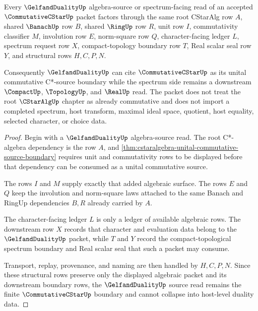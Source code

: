 \begin{theorem}
\label{thm:commutative-c-star-gelfand-spectrum-boundary}
Every $\GelfandDualityUp$ algebra-source or spectrum-facing read of an accepted $\CommutativeCStarUp$ packet factors through the same root CStarAlg row $A$, shared $\BanachUp$ row $B$, shared $\RingUp$ row $R$, unit row $I$, commutativity classifier $M$, involution row $E$, norm-square row $Q$, character-facing ledger $L$, spectrum request row $X$, compact-topology boundary row $T$, Real scalar seal row $Y$, and structural rows $H,C,P,N$.

Consequently $\GelfandDualityUp$ can cite $\CommutativeCStarUp$ as its unital commutative C*-source boundary while the spectrum side remains a downstream $\CompactUp$, $\TopologyUp$, and $\RealUp$ read. The packet does not treat the root $\CStarAlgUp$ chapter as already commutative and does not import a completed spectrum, host transform, maximal ideal space, quotient, host equality, selected character, or choice data.
\end{theorem}
\begin{proof}
Begin with a $\GelfandDualityUp$ algebra-source read. The root C*-algebra dependency is the row $A$, and \autoref{thm:cstaralgebra-unital-commutative-source-boundary} requires unit and commutativity rows to be displayed before that dependency can be consumed as a unital commutative source.

The rows $I$ and $M$ supply exactly that added algebraic surface. The rows $E$ and $Q$ keep the involution and norm-square laws attached to the same Banach and RingUp dependencies $B,R$ already carried by $A$.

The character-facing ledger $L$ is only a ledger of available algebraic rows. The downstream row $X$ records that character and evaluation data belong to the $\GelfandDualityUp$ packet, while $T$ and $Y$ record the compact-topological spectrum boundary and Real scalar seal that such a packet may consume.

Transport, replay, provenance, and naming are then handled by $H,C,P,N$. Since these structural rows preserve only the displayed algebraic packet and its downstream boundary rows, the $\GelfandDualityUp$ source read remains the finite $\CommutativeCStarUp$ boundary and cannot collapse into host-level duality data.
\end{proof}


